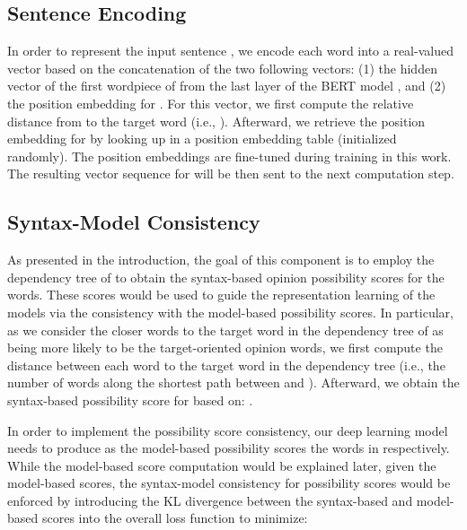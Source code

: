 \documentclass[11pt,a4paper]{article}
\begin{document}
\subsection{Sentence Encoding}







In order to represent the input sentence , we encode each word  into a real-valued vector  based on the concatenation of the two following vectors: (1) the hidden vector of the first wordpiece of  from the last layer of the BERT model \cite{Devlin:19}, and (2) the position embedding for . For this vector, we first compute the relative distance  from  to the target word  (i.e., ). Afterward, we retrieve the position embedding for  by looking up  in a position embedding table (initialized randomly). The position embeddings are fine-tuned during training in this work. The resulting vector sequence  for  will be then sent to the next computation step.



\subsection{Syntax-Model Consistency}
\label{sec:importance-encoder}

As presented in the introduction, the goal of this component is to employ the dependency tree of  to obtain the syntax-based opinion possibility scores for the words. These scores would be used to guide the representation learning of the models via the consistency with the model-based possibility scores. In particular, as we consider the closer words to the target word  in the dependency tree of  as being more likely to be the target-oriented opinion words, we first compute the distance  between each word  to the target word  in the dependency tree (i.e., the number of words along the shortest path between  and ). Afterward, we obtain the syntax-based possibility score  for  based on: .



In order to implement the possibility score consistency, our deep learning model needs to produce  as the model-based possibility scores the words  in  respectively. While the model-based score computation would be explained later, given the model-based scores, the syntax-model consistency for possibility scores would be enforced by introducing the KL divergence  between the syntax-based and model-based scores into the overall loss function to minimize:
\end{document}
